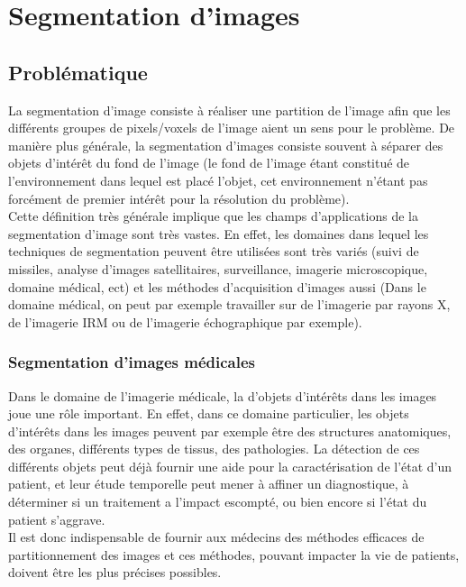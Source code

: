 \section{Segmentation d'images}

\subsection{Problématique}
La segmentation d'image consiste à réaliser une partition de l'image afin que les différents groupes de pixels/voxels de l'image aient un sens pour le problème. De manière plus générale, la segmentation d'images consiste souvent à séparer des objets d'intérêt du fond de l'image (le fond de l'image étant constitué de l'environnement dans lequel est placé l'objet, cet environnement n'étant pas forcément de premier intérêt pour la résolution du problème).\\

Cette définition très générale implique que les champs d'applications de la segmentation d'image sont très vastes. En effet, les domaines dans lequel les techniques de segmentation peuvent être utilisées sont très variés (suivi de missiles, analyse d'images satellitaires, surveillance, imagerie microscopique, domaine médical, ect) et les méthodes d'acquisition d'images aussi (Dans le domaine médical, on peut par exemple travailler sur de l'imagerie par rayons X, de l'imagerie IRM ou de l'imagerie échographique par exemple).

\subsubsection*{Segmentation d'images médicales}

Dans le domaine de l'imagerie médicale, la d'objets d'intérêts dans les images joue une rôle important. En effet, dans ce domaine particulier, les objets d'intérêts dans les images peuvent par exemple être des structures anatomiques, des organes, différents types de tissus, des pathologies. La détection de ces différents objets peut déjà fournir une aide pour la caractérisation de l'état d'un patient, et leur étude temporelle peut mener à affiner un diagnostique, à déterminer si un traitement a l'impact escompté, ou bien encore si l'état du patient s'aggrave.\\

Il est donc indispensable de fournir aux médecins des méthodes efficaces de partitionnement des images et ces méthodes, pouvant impacter la vie de patients, doivent être les plus précises possibles.\\

